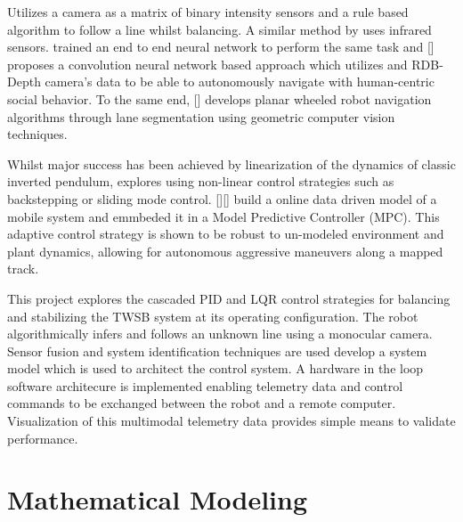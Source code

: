     \cite{visionlinetwsb} Utilizes a camera as a matrix of binary intensity sensors 
    and a rule based algorithm to  follow a line whilst balancing. A similar method by \cite{ghani2011two} uses 
    infrared sensors. \cite{nntwsbvison} trained an end to end neural network to perform the same task and [] proposes 
    a convolution neural network based approach which utilizes and RDB-Depth camera's data to be able to 
    autonomously navigate with human-centric social behavior. 
    To the same end, [] develops planar wheeled robot navigation algorithms through lane segmentation using 
    geometric computer vision techniques. 

    Whilst major success has been achieved by linearization of the dynamics of classic inverted pendulum, 
    \cite{AdvancedWIP} explores using non-linear control strategies such as backstepping or sliding mode control.
    [][] build a online data driven model of a mobile system and emmbeded it in a Model Predictive Controller (MPC). 
    This adaptive control strategy is shown to be robust to un-modeled environment and plant dynamics, 
    allowing for autonomous aggressive maneuvers along a mapped track.
    
    This project explores the cascaded PID and LQR control strategies for balancing and stabilizing 
    the TWSB system at its operating configuration. The robot algorithmically infers and follows an unknown line 
    using a monocular camera. Sensor fusion and system identification techniques are used develop a system model 
    which is used to architect the control system. A hardware in the loop software architecure is 
    implemented enabling telemetry data and control commands to be exchanged between the robot 
    and a remote computer. Visualization of this multimodal telemetry data provides simple
    means to validate performance. 
    \pagebreak{}

    \section{Mathematical Modeling} %
